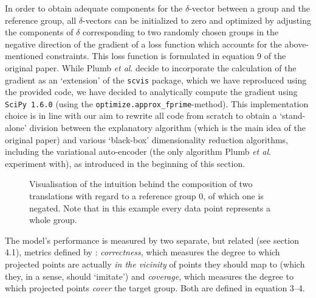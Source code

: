 In order to obtain adequate components for the $\delta$-vector between a group and the reference group, all $\delta$-vectors can be initialized to zero and optimized by adjusting the components of $\delta$ corresponding to two randomly chosen groups in the negative direction of the gradient of a loss function which accounts for the above-mentioned constraints. This loss function is formulated in equation 9 of the original paper. While Plumb \textit{et al}. decide to incorporate the calculation of the gradient as an `extension' of the \texttt{scvis} package, which we have reproduced using the provided code, we have decided to analytically compute the gradient using \texttt{SciPy 1.6.0} (using the \texttt{optimize.approx\_fprime}-method). This implementation choice is in line with our aim to rewrite all code from scratch to obtain a `stand-alone' division between the explanatory algorithm (which is the main idea of the original paper) and various `black-box' dimensionality reduction algorithms, including the variational auto-encoder (the only algorithm Plumb \textit{et al}. experiment with), as introduced in the beginning of this section.\\

\begin{figure}
  \centering
  \scalebox{0.78}{}
  \caption{Visualisation of the intuition behind the composition of two translations with regard to a reference group $0$, of which one is negated. Note that in this example every data point represents a whole group.}
\end{figure}

The model's performance is measured by two separate, but related (see section 4.1), metrics defined by \cite[p.~3]{plumb2020explaining}: \textit{correctness}, which measures the degree to which projected points are actually \textit{in the vicinity} of points they should map to (which they, in a sense, should `imitate') and \textit{coverage}, which measures the degree to which projected points \textit{cover} the target group. Both are defined in equation 3--4.

